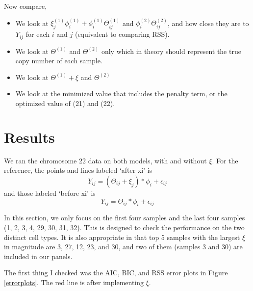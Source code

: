 \documentclass[11pt]{article}
\begin{document}
Now compare,
\begin{itemize}

\item
We look at $\xi_j^{(1)} \phi_i^{(1)} + \phi_i^{(1)}\Theta_{ij}^{(1)}$ and $\phi_i^{(2)}\Theta_{ij}^{(2)}$, and how close they are to $Y_{ij}$ for each $i$ and $j$ (equivalent to comparing RSS).

\item
We look at $\Theta^{(1)}$ and $\Theta^{(2)}$ only which in theory should represent the true copy number of each sample.

\item
We look at $\Theta^{(1)} + \xi$ and $\Theta^{(2)}$

\item
We look at the minimized value that includes the penalty term, or the optimized value of (21) and (22). 

\end{itemize}

\section{Results}
We ran the chromosome 22 data on both models, with and without $\xi$. For the reference, the points and lines labeled `after xi' is
$$Y_{ij} = (\Theta_{ij} + \xi_j)*\phi_i + \epsilon_{ij}$$
and those labeled `before xi' is
$$Y_{ij} = \Theta_{ij} * \phi_i + \epsilon_{ij}$$

In this section, we only focus on the first four samples and the last four samples (1, 2, 3, 4, 29, 30, 31, 32). This is designed to check the performance on the two distinct cell types. It is also appropriate in that top 5 samples with the largest $\xi$ in magnitude are 3, 27, 12, 23, and 30, and two of them (samples 3 and 30) are included in our panels. 


The first thing I checked was the AIC, BIC, and RSS error plots in Figure \ref{errorplots}. The red line is after implementing $\xi$. 
\end{document}
